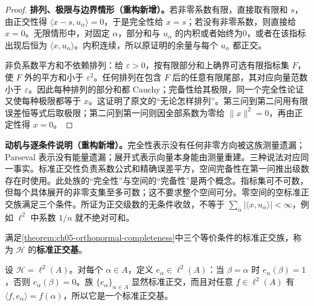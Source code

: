 \documentclass[../../main.tex]{subfiles}
\begin{document}
\begin{proof}
\textbf{排列、极限与边界情形（重构新增）。}若非零系数有限，直接取有限和 $s$，由正交性得 $\langle x-s,u_\alpha\rangle=0$，于是完全性给 $x=s$；若没有非零系数，则直接给 $x=0$。无限情形中，对固定 $\alpha$，部分和与 $u_\alpha$ 的内积或者始终为0，或者在该指标出现后恒为 $\langle x,u_\alpha\rangle$。内积连续，所以原证明的余量与每个 $u_\alpha$ 都正交。

非负系数平方和不依赖排列：给 $\varepsilon>0$，按有限部分和上确界可选有限指标集 $F$，使 $F$ 外的平方和小于 $\varepsilon^2$。任何排列在包含 $F$ 后的任意有限尾部，其对应向量范数小于 $\varepsilon$。因此每种排列的部分和都 Cauchy；完备性给其极限，同一个完全性论证又使每种极限都等于 $x$。这证明了原文的“无论怎样排列”。第三问到第二问用有限误差恒等式后取极限；第二问到第一问则因全部系数为零给 $\|x\|^2=0$，再由正定性得 $x=0$。
\end{proof}
\begin{remark}
\textbf{动机与逐条件说明（重构新增）。}完全性表示没有任何非零方向被这族测量遗漏；Parseval 表示没有能量遗漏；展开式表示向量本身能由测量重建。三种说法对应同一事实。标准正交性负责系数公式和精确误差平方，空间完备性在第一问推出级数存在时使用。此处族的“完全性”与空间的“完备性”是两个概念。指标集可不可数，但每个具体展开的非零支集至多可数；这不要求整个空间可分。零空间的空标准正交族满足三个条件。所证为正交级数的无条件收敛，不等于 $\sum_\alpha|\langle x,u_\alpha\rangle|<\infty$，例如 $\ell^2$ 中系数 $1/n$ 就不绝对可和。
\end{remark}
\begin{definition}[标准正交基]\label{definition:ch05-orthonormal-basis}
满足\cref{theorem:ch05-orthonormal-completeness}中三个等价条件的标准正交族，称为 $\mathscr H$ 的\textbf{标准正交基}。
\end{definition}
\begin{example}\label{example:ch05-ell2-standard-basis}
设 $\mathscr H=\ell^2(A)$。对每个 $\alpha\in A$，定义 $e_\alpha\in\ell^2(A)$：当 $\beta=\alpha$ 时 $e_\alpha(\beta)=1$，否则 $e_\alpha(\beta)=0$。族 $\{e_\alpha\}_{\alpha\in A}$ 显然标准正交，而且对任意 $f\in\ell^2(A)$ 有 $\langle f,e_\alpha\rangle=f(\alpha)$，所以它是一个标准正交基。
\end{example}
\end{document}

